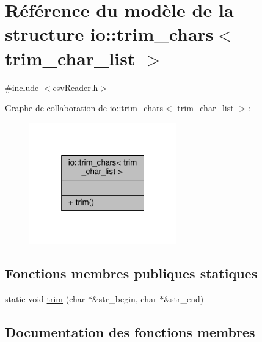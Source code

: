\hypertarget{structio_1_1trim__chars}{}\section{Référence du modèle de la structure io\+:\+:trim\+\_\+chars$<$ trim\+\_\+char\+\_\+list $>$}
\label{structio_1_1trim__chars}


{\ttfamily \#include $<$csv\+Reader.\+h$>$}



Graphe de collaboration de io\+:\+:trim\+\_\+chars$<$ trim\+\_\+char\+\_\+list $>$\+:\nopagebreak
\begin{figure}[H]
\begin{center}
\leavevmode
\includegraphics[width=181pt]{structio_1_1trim__chars__coll__graph}
\end{center}
\end{figure}
\subsection*{Fonctions membres publiques statiques}
\begin{DoxyCompactItemize}
\item 
static void \hyperlink{structio_1_1trim__chars_a4cffc5e839ab4024ca8c8330e26e338c}{trim} (char $\ast$\&str\+\_\+begin, char $\ast$\&str\+\_\+end)
\end{DoxyCompactItemize}


\subsection{Documentation des fonctions membres}
\mbox{\label{structio_1_1trim__chars_a4cffc5e839ab4024ca8c8330e26e338c}} 
